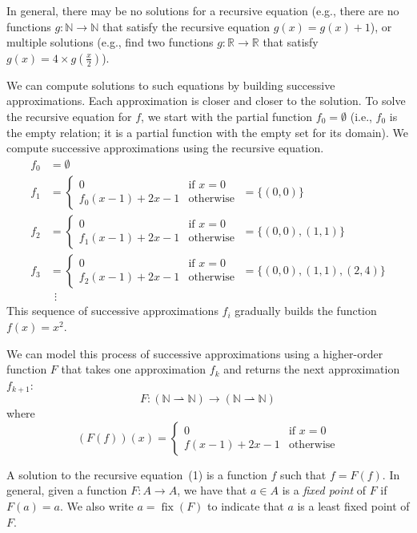 In general, there may be no solutions for a recursive equation (e.g., there are no functions $g
: \mathbb{N} \to \mathbb{N}$ that satisfy the recursive equation $g(x) = g(x) + 1$), or multiple
solutions (e.g., find two functions $g : \mathbb{R} \to \mathbb{R}$ that satisfy $g(x) = 4
\times g(\frac{x}{2})$).

We can compute solutions to such equations by building successive approximations. Each
approximation is closer and closer to the solution. To solve the recursive equation for $f$, we
start with the partial function $f_0 = \emptyset$ (i.e., $f_0$ is the empty relation; it is a
partial function with the empty set for its domain). We compute successive approximations
using the recursive equation.
\begin{align*}
f_0 &= \emptyset \\
f_1 &=
\begin{cases}
0 & \text{if } x = 0 \\
f_0(x - 1) + 2x - 1 & \text{otherwise}
\end{cases}
\; = \{(0, 0)\} \\
f_2 &=
\begin{cases}
0 & \text{if } x = 0 \\
f_1(x - 1) + 2x - 1 & \text{otherwise}
\end{cases}
\; = \{(0, 0), (1, 1)\} \\
f_3 &=
\begin{cases}
0 & \text{if } x = 0 \\
f_2(x - 1) + 2x - 1 & \text{otherwise}
\end{cases}
\; = \{(0, 0), (1, 1), (2, 4)\} \\
&\ \ \vdots
\end{align*}
This sequence of successive approximations $f_i$ gradually builds the function $f(x) = x^2$.

We can model this process of successive approximations using a higher-order function $F$ that
takes one approximation $f_k$ and returns the next approximation $f_{k+1}$:
\[
F : (\mathbb{N} \rightharpoonup \mathbb{N}) \to (\mathbb{N} \rightharpoonup \mathbb{N})
\]
where
\[
(F(f))(x) =
\begin{cases}
0 & \text{if } x = 0 \\
f(x - 1) + 2x - 1 & \text{otherwise}
\end{cases}
\]

A solution to the recursive equation~(1) is a function $f$ such that $f = F(f)$. In general,
given a function $F : A \to A$, we have that $a \in A$ is a \emph{fixed point} of $F$ if $F(a) =
a$. We also write $a = \operatorname{fix}(F)$ to indicate that $a$ is a least fixed point of
$F$.

